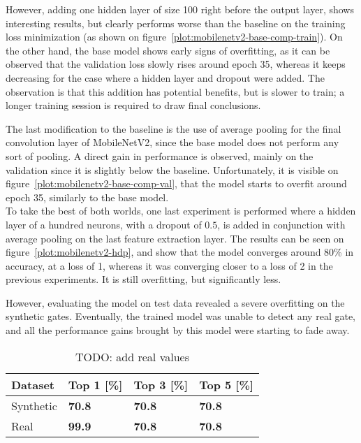However, adding one hidden layer of size 100 right before the output layer,
shows interesting results, but clearly performs worse than the baseline on the
training loss minimization (as shown on
figure~\ref{plot:mobilenetv2-base-comp-train}).  On the other hand, the base
model shows early signs of overfitting, as it can be observed that the
validation loss slowly rises around epoch 35, whereas it keeps decreasing for
the case where a hidden layer and dropout were added. The observation is that
this addition has potential benefits, but is slower to train; a longer training
session is required to draw final conclusions.


The last modification to the baseline is the use of average pooling for the
final convolution layer of MobileNetV2, since the base model does not perform
any sort of pooling. A direct gain in performance is observed, mainly on the
validation since it is slightly below the baseline. Unfortunately, it is
visible on figure~\ref{plot:mobilenetv2-base-comp-val}, that the model starts
to overfit around epoch 35, similarly to the base model.\\

To take the best of both worlds, one last experiment is performed where a
hidden layer of a hundred neurons, with a dropout of $0.5$, is added in
conjunction with average pooling on the last feature extraction layer. The
results can be seen on figure~\ref{plot:mobilenetv2-hdp}, and show that the
model converges around 80\% in accuracy, at a loss of 1, whereas it was
converging closer to a loss of 2 in the previous experiments. It is still
overfitting, but significantly less.



However, evaluating the model on test data revealed a severe overfitting on the
synthetic gates. Eventually, the trained model was unable to detect any real
gate, and all the performance gains brought by this model were starting to fade
away.\\

\begin{table}[!h]
    \centering
    \caption{TODO: add real values}
    \begin{tabular}{llll}
        \toprule
		Dataset & Top 1 [\%] & Top 3 [\%] & Top 5 [\%]\\
        \midrule         
		Synthetic & \textbf{70.8} & \textbf{70.8} & \textbf{70.8} \\ 
        Real & \textbf{99.9} & \textbf{70.8} & \textbf{70.8} \\
        \bottomrule
    \end{tabular}
    \label{tab:my_label}
\end{table}

\clearpage
